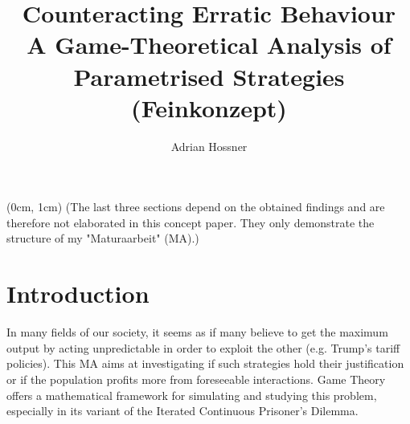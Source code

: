 \documentclass{article}
\title{
	Counteracting Erratic Behaviour\\
	A Game-Theoretical Analysis of Parametrised Strategies\\
	(Feinkonzept)
}
\author{Adrian Hossner}
\begin{document}
\maketitle
\tableofcontents


\begin{textblock*}{100mm}(0cm, 1cm)
	(The last three sections depend on the obtained findings and are therefore not elaborated in this concept paper. They only demonstrate the structure of my "Maturaarbeit" (MA).)
\end{textblock*}
\newpage

\section{Introduction}
	In many fields of our society, it seems as if many believe to get the maximum output by acting unpredictable in order to exploit the other (e.g. Trump's tariff policies). This MA aims at investigating if such strategies hold their justification or if the population profits more from foreseeable interactions. Game Theory offers a mathematical framework for simulating and studying this problem, especially in its variant of the Iterated Continuous Prisoner's Dilemma.
\end{document}
